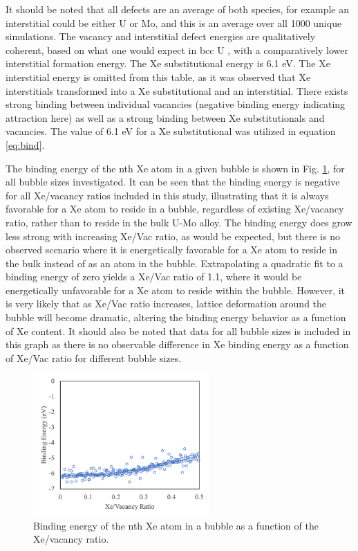 \documentclass[review]{elsarticle}
\begin{document}
It should be noted that all defects are an average of both species, for example an interstitial could be either U or Mo, and this is an average over all 1000 unique simulations. The vacancy and interstitial defect energies are qualitatively coherent, based on what one would expect in bcc U \cite{beeler2010}, with a comparatively lower interstitial formation energy. The Xe substitutional energy is 6.1 eV. The Xe interstitial energy is omitted from this table, as it was observed that Xe interstitials transformed into a Xe substitutional and an interstitial. There exists strong binding between individual vacancies (negative binding energy indicating attraction here) as well as a strong binding between Xe substitutionals and vacancies. The value of 6.1 eV for a Xe substitutional was utilized in equation \ref{eq:bind}.

The binding energy of the nth Xe atom in a given bubble is shown in Fig. \ref{fig:binding}, for all bubble sizes investigated. It can be seen that the binding energy is negative for all Xe/vacancy ratios included in this study, illustrating that it is always favorable for a Xe atom to reside in a bubble, regardless of existing Xe/vacancy ratio, rather than to reside in the bulk U-Mo alloy. The binding energy does grow less strong with increasing Xe/Vac ratio, as would be expected, but there is no observed scenario where it is energetically favorable for a Xe atom to reside in the bulk instead of as an atom in the bubble. Extrapolating a quadratic fit to a binding energy of zero yields a Xe/Vac ratio of 1.1, where it would be energetically unfavorable for a Xe atom to reside within the bubble. However, it is very likely that as Xe/Vac ratio increases, lattice deformation around the bubble will become dramatic, altering the binding energy behavior as a function of Xe content. It should also be noted that data for all bubble sizes is included in this graph as there is no observable difference in Xe binding energy as a function of Xe/Vac ratio for different bubble sizes. 

\begin{figure}[h]
 \centering
 \includegraphics[width=0.6\textwidth]{4_binding.png} 
 \caption{Binding energy of the nth Xe atom in a bubble as a function of the Xe/vacancy ratio.}
 \label{fig:binding}
\end{figure}
\end{document}
